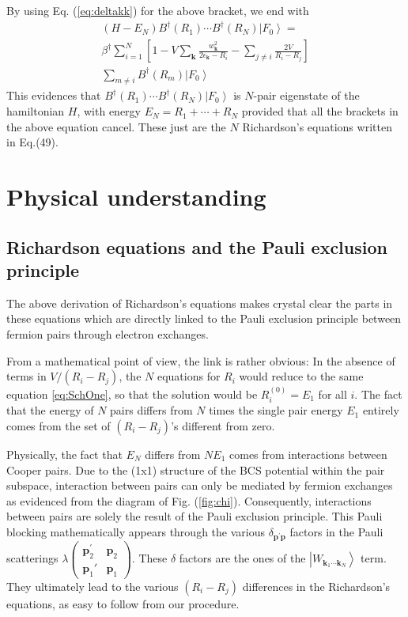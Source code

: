 \documentclass[epj]{svjour}
\newcommand{\vk}{\ensuremath{\mathbf{k}}}
\newcommand{\vp}{\ensuremath{\mathbf{p}}}
\begin{document}
By using  Eq. (\ref{eq:deltakk}) for the above bracket, we end with  
\begin{multline}  
(H-E _N)B^{\dagger}(R_1)\cdots{}B^{\dagger}(R_N)\left|F_0%
\right>  = \\
\beta^\dagger\sum_{i=1}^N\left[1-V\sum_\vk\frac{w_{\mathbf{k} }^2}{2\epsilon_{\mathbf{k}}-R_i}-\sum_{j\neq{}i}\frac{2V%
}{R_i-R_j}\right]\\
\sum_{m\neq{i}}B^{\dagger}(R_m)\left|F_0\right>  
\end{multline}
This evidences that $B^{\dagger}(R_1)\cdots{}B^{\dagger}(R_N)\left|F_0\right> $ is $N$-pair eigenstate of the hamiltonian $H$, with energy $E_N=R_1+\cdots+R_N$ provided that all the brackets in the above equation cancel. These just are the $N$ Richardson's equations written in Eq.(49).
\section{Physical understanding}

\subsection{Richardson equations and the Pauli exclusion principle}

The above  derivation of Richardson's equations makes crystal clear the parts in these equations which are directly linked
to the Pauli exclusion principle between fermion pairs through electron exchanges. 

From a mathematical point of view, the link is rather obvious: In the
absence of terms in $V/(R_i-R_j)$, the $N$ equations for $R_i$ would reduce to
the same equation \eqref{eq:SchOne}, so that the solution would be $R^{(0)}_i=%
E _1$ for all $i$. The fact that the energy of $N$ pairs differs
from $N$ times the single pair energy $E_1$ entirely comes from the set of $(R_i-R_j)$'s
different from zero.

Physically, the fact that $E _N$ differs from $NE _1$
comes from interactions between Cooper pairs. Due to the (1x1) structure of the BCS
potential within the pair subspace, interaction between pairs can only be mediated by fermion
exchanges as evidenced from the diagram of Fig. (\ref{fig:chi}). 
Consequently, interactions between pairs
are solely the result of the Pauli exclusion principle. This
Pauli blocking mathematically appears through the various $\delta_{\mathbf{p}
^{\prime}\mathbf{p} }$ factors in the Pauli scatterings $\lambda(%
\begin{smallmatrix}\vp^\prime_2&\vp_2\\\vp_1'&\vp_1\end{smallmatrix})  $. These $\delta$ factors are the ones of the $\left|W_{\mathbf{k} _1\cdots\mathbf{k} _N}\right>$ term.  They ultimately lead to the various $(R_i-R_j)$ differences
 in the Richardson's equations, as easy to follow from our procedure.
\end{document}
